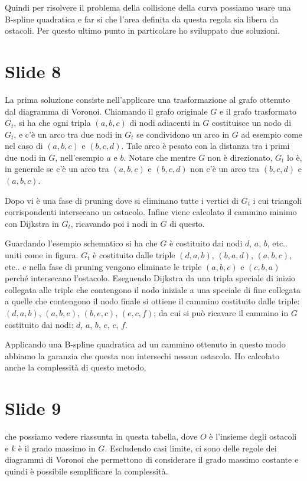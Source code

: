 \documentclass{article}
\begin{document}
Quindi per risolvere il problema della collisione della curva possiamo
usare una B-spline quadratica e far si che l'area definita da questa
regola sia libera da ostacoli. Per questo ultimo punto in particolare
ho sviluppato due soluzioni.

\section*{Slide 8}
La prima soluzione consiste nell'applicare una trasformazione al grafo
ottenuto dal diagramma di Voronoi. Chiamando il grafo originale $G$ e
il grafo trasformato $G_t$, si ha che ogni tripla $(a,b,c)$ di nodi
adiacenti in
$G$ costituisce un nodo di $G_t$, e c'è un arco tra due nodi in $G_t$
se condividono un arco in $G$ ad esempio come nel caso di $(a,b,c)$ e
$(b,c,d)$. Tale arco è pesato con la distanza tra i primi due nodi in
$G$, nell'esempio $a$ e $b$. Notare che mentre $G$ non è direzionato,
$G_t$ lo è, in generale se c'è un arco tra $(a,b,c)$ e $(b,c,d)$ non
c'è un arco tra $(b,c,d)$ e $(a,b,c)$.

Dopo vi è una fase di pruning dove si eliminano
tutte i vertici di $G_t$ i cui triangoli corrispondenti intersecano un
ostacolo. Infine viene calcolato il cammino minimo con Dijkstra in
$G_t$, ricavando poi i nodi in $G$ di questo.

Guardando l'esempio schematico si ha che $G$ è costituito dai nodi
$d$, $a$, $b$, etc.. uniti come in figura. $G_t$ è costituito dalle
triple $(d,a,b)$, $(b,a,d)$, $(a,b,c)$, etc.. e nella fase di pruning
vengono eliminate le triple $(a,b,c)$ e $(c,b,a)$ perché intersecano
l'ostacolo. Eseguendo Dijkstra da una tripla speciale di inizio
collegata alle triple che contengono il nodo
iniziale a una speciale di fine collegata a quelle che contengono
il nodo finale si ottiene il cammino costituito dalle triple:
$(d,a,b)$, $(a,b,e)$, $(b,e,c)$, $(e,c,f)$; da cui si può ricavare il
cammino in $G$ costituito dai nodi: $d$, $a$, $b$, $e$, $c$, $f$.

Applicando una B-spline quadratica ad un cammino ottenuto in questo
modo abbiamo la garanzia che questa non intersechi nessun
ostacolo. Ho calcolato anche la complessità di questo metodo,

\section*{Slide 9}
che possiamo vedere riassunta in questa tabella, dove $O$ è l'insieme
degli ostacoli e $k$ è il grado massimo in $G$. Escludendo casi
limite, ci sono delle regole dei diagrammi di Voronoi che permettono
di considerare il grado massimo costante e quindi è possibile
semplificare la complessità.
\end{document}

